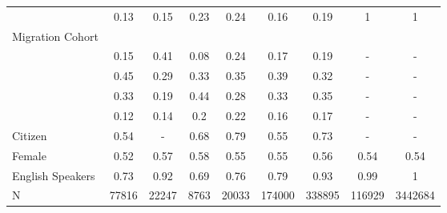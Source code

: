 \begin{table}[ht]
\begin{tabular}{>{\raggedright\arraybackslash}p{3.2cm}|cccccccc}
  \multicolumn{1}{>{\raggedleft\arraybackslash}p{2.9cm}|}{\makebox[2.9cm][r]{Greater than 50 }}& 0.13 & 0.15 & 0.23 & 0.24 & 0.16 & 0.19 & 1 & 1 \\ 
  Migration Cohort &  &  &  &  &  &  &  &  \\ 
  \multicolumn{1}{>{\raggedleft\arraybackslash}p{2.3cm}|}{\makebox[2.3cm][r]{Before 1965 }}& 0.15 & 0.41 & 0.08 & 0.24 & 0.17 & 0.19 & - & - \\ 
  \multicolumn{1}{>{\raggedleft\arraybackslash}p{2.2cm}|}{\makebox[2.2cm][r]{1965 - 1979 }}& 0.45 & 0.29 & 0.33 & 0.35 & 0.39 & 0.32 & - & - \\ 
  \multicolumn{1}{>{\raggedleft\arraybackslash}p{2.2cm}|}{\makebox[2.2cm][r]{1980 - 1999 }}& 0.33 & 0.19 & 0.44 & 0.28 & 0.33 & 0.35 & - & - \\ 
  \multicolumn{1}{>{\raggedleft\arraybackslash}p{2.1cm}|}{\makebox[2.1cm][r]{After 2000 }}& 0.12 & 0.14 & 0.2 & 0.22 & 0.16 & 0.17 & - & - \\ 
  Citizen & 0.54 & - & 0.68 & 0.79 & 0.55 & 0.73 & - & - \\ 
  Female & 0.52 & 0.57 & 0.58 & 0.55 & 0.55 & 0.56 & 0.54 & 0.54 \\ 
  English Speakers & 0.73 & 0.92 & 0.69 & 0.76 & 0.79 & 0.93 & 0.99 & 1 \\ 
  N & 77816 & 22247 & 8763 & 20033 & 174000 & 338895 & 116929 & 3442684 \\ 
   \hline
\end{tabular}
\endgroup
\end{table}
